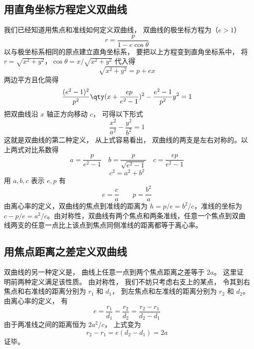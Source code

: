 


\subsection{用直角坐标方程定义双曲线}
我们已经知道用焦点和准线如何定义双曲线， 双曲线的极坐标方程为（$e>1$）
\begin{equation}
r = \frac{p}{1 - e\cos \theta }
\end{equation}
以与极坐标系相同的原点建立直角坐标系， 要把以上方程变到直角坐标系中， 将$r = \sqrt{x^2 + y^2}$，$\cos \theta  = x/\sqrt{x^2 + y^2}$ 代入得
\begin{equation}
\sqrt{x^2 + y^2}  = p + ex
\end{equation}
两边平方且化简得
\begin{equation}
\frac{(e^2 - 1)^2}{p^2} \qty(x + \frac{ep}{e^2 - 1} )^2 - \frac{e^2 - 1}{p^2} y^2 = 1
\end{equation}
把双曲线沿 $x$ 轴正方向移动 $c$， 可得以下形式
\begin{equation}\label{Hypb3_eq4}
\frac{x^2}{a^2} - \frac{y^2}{b^2} = 1
\end{equation}
这就是双曲线的第二种定义， 从上式容易看出， 双曲线的两支是左右对称的。以上两式对比系数得
\begin{equation}
a = \frac{p}{e^2 - 1} \quad  b = \frac{p}{\sqrt{e^2 - 1} } \quad c = \frac{ep}{e^2 - 1}
\end{equation}
\begin{equation}
c^2 = a^2 + b^2
\end{equation}
用 $a, b, c$ 表示 $e,p$ 有
\begin{equation}
e = \frac{c}{a} \qquad p = \frac{b^2}{a}
\end{equation}
由离心率的定义，双曲线的焦点到准线的距离为 $h = p/e=b^2/c$，准线的坐标为 $c-p/e = a^2/c$。由对称性，双曲线有两个焦点和两条准线，任意一个焦点到双曲线两支的任意一点比上该点到焦点同侧准线的距离都等于离心率。

\subsection{用焦点距离之差定义双曲线}
双曲线的另一种定义是， 曲线上任意一点到两个焦点距离之差等于 $2a$。 这里证明前两种定义满足该性质。 由对称性， 我们不妨只考虑右支上的某点， 令其到右焦点和右准线的距离分别为 $r_1$ 和 $d_1$， 到左焦点和左准线的距离分别为 $r_2$ 和 $d_2$。 由离心率的定义， 有
\begin{equation}
e = \frac{r_1}{d_1} = \frac{r_2}{d_2} = \frac{r_2 - r_1}{d_2 - d_1}
\end{equation}
由于两准线之间的距离恒为 $2a^2/c$， 上式变为
\begin{equation}
r_2 - r_1 = e(d_2 - d_1) = 2a
\end{equation}
证毕。

